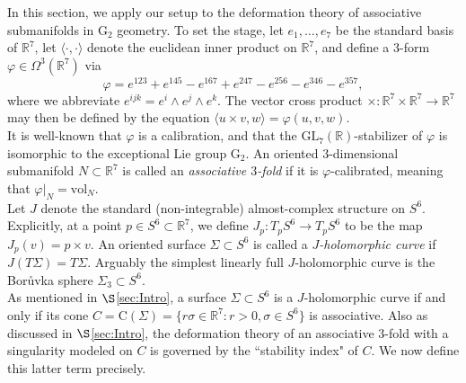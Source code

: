 \documentclass[11pt]{article}
\newcommand{\GL}{\mathrm{GL}}
\newcommand{\G}{\mathrm{G}}
\newcommand{\R}{\mathbb{R}}
\newcommand{\vol}{\mathrm{vol}}
\theoremstyle{definition}
\numberwithin{equation}{section}
\begin{document}
\indent \indent In this section, we apply our setup to the deformation theory of associative submanifolds in $\mathrm{G}_2$ geometry.  To set the stage, let $e_1, \ldots, e_7$ be the standard basis of $\R^7$, let $\langle \cdot, \cdot \rangle$ denote the euclidean inner product on $\R^7$, and define a $3$-form $\varphi \in \Omega^3(\R^7)$ via
\begin{equation} \label{eq:AssocForm}
    \varphi = e^{123}+e^{145}-e^{167}+ e^{247}-e^{256}-e^{346}-e^{357},
\end{equation}
where we abbreviate $e^{ijk} = e^i \wedge e^j \wedge e^k$.  The vector cross product $\times \colon \R^7 \times \R^7 \to \R^7$ may then be defined by the equation $\langle u \times v, w \rangle = \varphi(u,v,w)$. \\
\indent It is well-known that $\varphi$ is a calibration, and that the $\GL_7(\R)$-stabilizer of $\varphi$ is isomorphic to the exceptional Lie group $\G_2$.   An oriented $3$-dimensional submanifold $N \subset \R^7$ is called an \emph{associative $3$-fold} if it is $\varphi$-calibrated, meaning that $\varphi|_N = \vol_N$.   \\
\indent Let $J$ denote the standard (non-integrable) almost-complex structure on $S^6$.  Explicitly, at a point $p \in S^6 \subset \R^7$, we define $J_p \colon T_pS^6 \to T_pS^6$ to be the map $J_p(v) = p \times v$.  An oriented surface $\Sigma \subset S^6$ is called a \emph{$J$-holomorphic curve} if $J(T\Sigma) = T\Sigma$.  Arguably the simplest linearly full $J$-holomorphic curve is the Bor{\r{u}}vka sphere $\Sigma_3 \subset S^6$. \\
\indent As mentioned in $\S$\ref{sec:Intro}, a surface $\Sigma \subset S^6$ is a $J$-holomorphic curve if and only if its cone $C = \mathrm{C}(\Sigma) = \{r \sigma \in \R^7 \colon r > 0, \sigma \in S^6\}$ is associative.  Also as discussed in $\S$\ref{sec:Intro}, the deformation theory of an associative $3$-fold with a singularity modeled on $C$ is governed by the ``stability index" of $C$.  We now define this latter term precisely.
\end{document}

